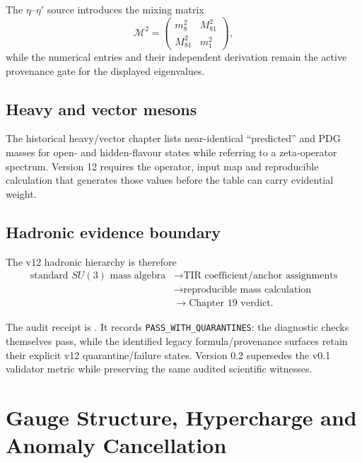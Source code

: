 The $\eta$--$\eta'$ source introduces the mixing matrix
\begin{equation}
\mathcal M^2=
\begin{pmatrix}
m_8^2&M_{81}^2\\
M_{81}^2&m_1^2
\end{pmatrix},
\end{equation}
while the numerical entries and their independent derivation remain the active provenance gate for the displayed eigenvalues.

\section{Heavy and vector mesons}

The historical heavy/vector chapter lists near-identical ``predicted'' and PDG masses for open- and hidden-flavour states while referring to a zeta-operator spectrum. Version 12 requires the operator, input map and reproducible calculation that generates those values before the table can carry evidential weight.

\section{Hadronic evidence boundary}

The v12 hadronic hierarchy is therefore
\[
\boxed{\begin{aligned}
\text{standard }SU(3)\text{ mass algebra}
&\to \text{TIR coefficient/anchor assignments}\\
&\to \text{reproducible mass calculation}\\
&\to \text{Chapter 19 verdict}.
\end{aligned}}
\]

The audit receipt is
. It records \texttt{PASS\_WITH\_QUARANTINES}: the diagnostic checks themselves pass, while the identified legacy formula/provenance surfaces retain their explicit v12 quarantine/failure states. Version 0.2 supersedes the v0.1 validator metric while preserving the same audited scientific witnesses.

\clearpage

\chapter[Gauge Structure and Anomalies]{Gauge Structure, Hypercharge and Anomaly Cancellation}
\label{ch:v12_gauge_hypercharge}

